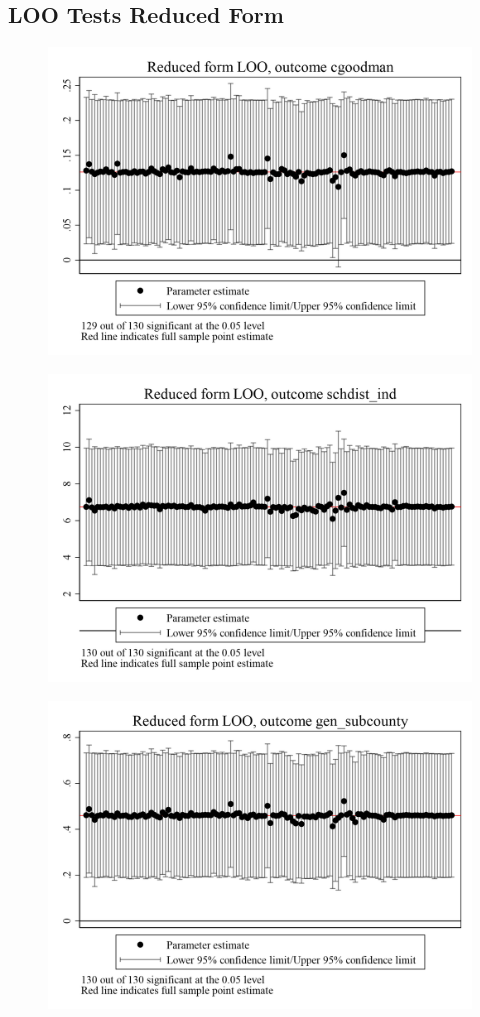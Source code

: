 \documentclass{article}
\begin{document}
\subsection{LOO Tests Reduced Form}
\clearpage

\begin{figure}
	\centering
	\includegraphics[width=.8\textwidth]{figures/exogeneity_tests/loo_rf_cgoodman.png}
\end{figure}
\clearpage
\begin{figure}
	\centering
	\includegraphics[width=.8\textwidth]{figures/exogeneity_tests/loo_rf_schdist_ind.png}
\end{figure}
\clearpage
\begin{figure}
	\centering
	\includegraphics[width=.8\textwidth]{figures/exogeneity_tests/loo_rf_gen_subcounty.png}
\end{figure}
\end{document}
